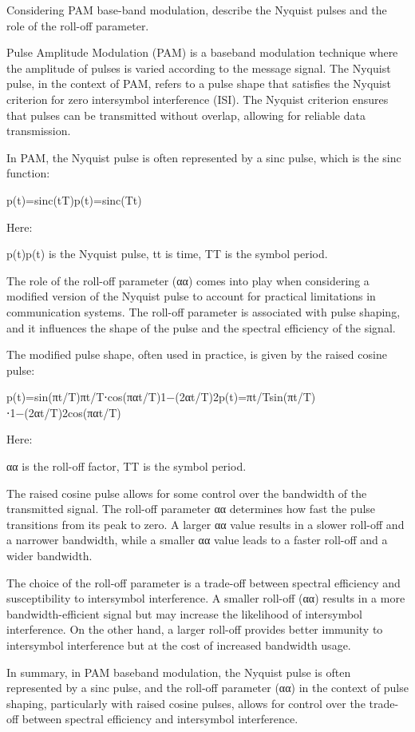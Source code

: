 


Considering PAM base-band modulation, describe the Nyquist pulses and the role of the roll-off parameter.



Pulse Amplitude Modulation (PAM) is a baseband modulation technique where the amplitude of pulses is varied according to the message signal. The Nyquist pulse, in the context of PAM, refers to a pulse shape that satisfies the Nyquist criterion for zero intersymbol interference (ISI). The Nyquist criterion ensures that pulses can be transmitted without overlap, allowing for reliable data transmission.

In PAM, the Nyquist pulse is often represented by a sinc pulse, which is the sinc function:

p(t)=sinc(tT)p(t)=sinc(Tt​)

Here:

p(t)p(t) is the Nyquist pulse,
tt is time,
TT is the symbol period.

The role of the roll-off parameter (αα) comes into play when considering a modified version of the Nyquist pulse to account for practical limitations in communication systems. The roll-off parameter is associated with pulse shaping, and it influences the shape of the pulse and the spectral efficiency of the signal.

The modified pulse shape, often used in practice, is given by the raised cosine pulse:

p(t)=sin⁡(πt/T)πt/T⋅cos⁡(παt/T)1−(2αt/T)2p(t)=πt/Tsin(πt/T)​⋅1−(2αt/T)2cos(παt/T)​

Here:

αα is the roll-off factor,
TT is the symbol period.

The raised cosine pulse allows for some control over the bandwidth of the transmitted signal. The roll-off parameter αα determines how fast the pulse transitions from its peak to zero. A larger αα value results in a slower roll-off and a narrower bandwidth, while a smaller αα value leads to a faster roll-off and a wider bandwidth.

The choice of the roll-off parameter is a trade-off between spectral efficiency and susceptibility to intersymbol interference. A smaller roll-off (αα) results in a more bandwidth-efficient signal but may increase the likelihood of intersymbol interference. On the other hand, a larger roll-off provides better immunity to intersymbol interference but at the cost of increased bandwidth usage.

In summary, in PAM baseband modulation, the Nyquist pulse is often represented by a sinc pulse, and the roll-off parameter (αα) in the context of pulse shaping, particularly with raised cosine pulses, allows for control over the trade-off between spectral efficiency and intersymbol interference.



